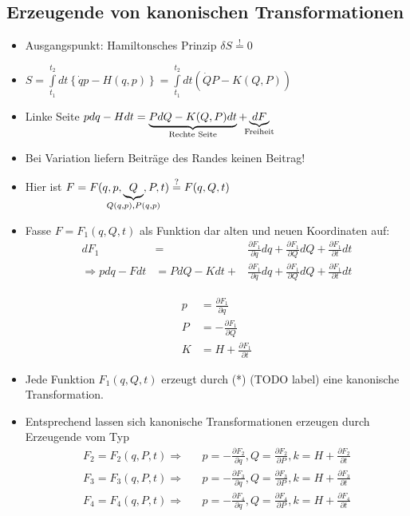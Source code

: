 \subsection{Erzeugende von kanonischen Transformationen}
\begin{itemize}
\item Ausgangspunkt: Hamiltonsches Prinzip
  $\delta S \stackrel{!}{=} 0$
\item
  $S = \int\limits_{t_1}^{t_2} dt \left\{ \dot{q} p - H(q,p) \right\}
  = \int\limits_{t_1}^{t_2}dt \left( \dot{Q}P - K(Q,P) \right) $
\item Linke Seite
  $pdq - Hdt = \underbrace{PdQ - K(Q,P) dt}_{\mathclap{\text{Rechte Seite}}} +
  \underbrace{dF}_{\mathclap{\text{Freiheit}}}$
\item Bei Variation liefern Beiträge des Randes keinen Beitrag!
\item Hier ist
  $F = F ( q,p,\underbrace{Q}_{\mathclap{Q(q,p),P(q,p)}},P,t )
  \stackrel{?}{=} F(q,Q,t)$
\item Fasse $F = F_1(q,Q,t)$ als Funktion dar alten und neuen
  Koordinaten auf:
  \begin{align*}
\label{eq:2}
dF_1 &= &\frac{\partial F_1}{\partial q}dq + \frac{ \partial F_1}{\partial Q}dQ + \frac{\partial F_1}{\partial t} dt\\
\Rightarrow pdq - Fdt &= PdQ - Kdt + &\frac{\partial F_1}{\partial q}dq + \frac{ \partial F_1}{\partial Q}dQ + \frac{\partial F_1}{\partial t} dt
\end{align*}

\begin{align*}
p &= \frac{\partial F_1}{\partial q}\\
P &= - \frac{\partial F_1}{\partial Q}\\
K &= H + \frac{\partial F_1}{\partial t}
\end{align*}
\item Jede Funktion $F_1(q,Q,t)$ erzeugt durch (*) (TODO label) eine
  kanonische Transformation.
\item Entsprechend lassen sich kanonische Transformationen erzeugen
  durch Erzeugende vom Typ
  \begin{align*}
F_2 = F_2(q,P,t) \Rightarrow &&p = -\frac{\partial F_2}{\partial q}, Q = \frac{\partial F_2}{\partial P}, k = H + \frac{\partial F_2}{\partial t}\\
F_3 = F_3(q,P,t) \Rightarrow &&p = -\frac{\partial F_3}{\partial q}, Q = \frac{\partial F_3}{\partial P}, k = H + \frac{\partial F_3}{\partial t}\\
F_4 = F_4(q,P,t) \Rightarrow &&p = -\frac{\partial F_4}{\partial q}, Q = \frac{\partial F_4}{\partial P}, k = H + \frac{\partial F_4}{\partial t}
\end{align*}

\end{itemize}


